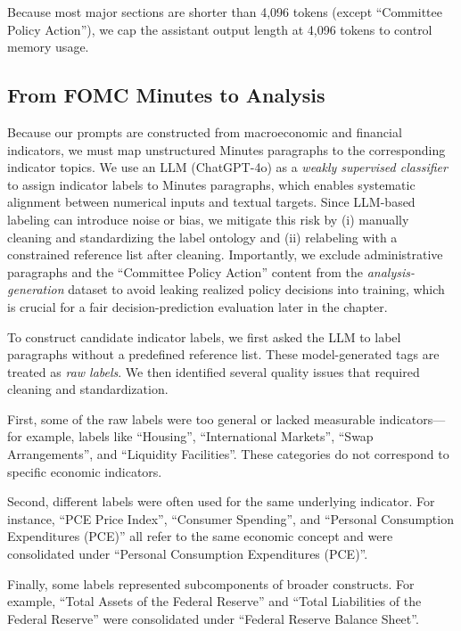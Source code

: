 Because most major sections are shorter than 4,096 tokens (except ``Committee Policy Action''), we cap the assistant output length at 4,096 tokens to control memory usage.




\subsection*{From FOMC Minutes to Analysis}


Because our prompts are constructed from macroeconomic and financial indicators, we must map unstructured Minutes paragraphs to the corresponding indicator topics. We use an LLM (ChatGPT-4o) as a \textit{weakly supervised classifier} to assign indicator labels to Minutes paragraphs, which enables systematic alignment between numerical inputs and textual targets. Since LLM-based labeling can introduce noise or bias, we mitigate this risk by (i) manually cleaning and standardizing the label ontology and (ii) relabeling with a constrained reference list after cleaning. Importantly, we exclude administrative paragraphs and the ``Committee Policy Action'' content from the \textit{analysis-generation} dataset to avoid leaking realized policy decisions into training, which is crucial for a fair decision-prediction evaluation later in the chapter.


To construct candidate indicator labels, we first asked the LLM to label paragraphs without a predefined reference list. These model-generated tags are treated as \textit{raw labels}. We then identified several quality issues that required cleaning and standardization.

First, some of the raw labels were too general or lacked measurable indicators—for example, labels like ``Housing'', ``International Markets'', ``Swap Arrangements'', and ``Liquidity Facilities''. These categories do not correspond to specific economic indicators.

Second, different labels were often used for the same underlying indicator. For instance, ``PCE Price Index'', ``Consumer Spending'', and ``Personal Consumption Expenditures (PCE)'' all refer to the same economic concept and were consolidated under ``Personal Consumption Expenditures (PCE)''.


Finally, some labels represented subcomponents of broader constructs. For example, ``Total Assets of the Federal Reserve'' and ``Total Liabilities of the Federal Reserve'' were consolidated under ``Federal Reserve Balance Sheet''.


